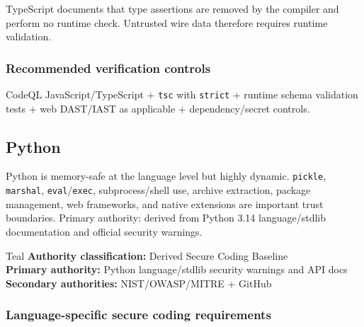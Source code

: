 \documentclass[10pt,letterpaper]{article}
\newcommand{\code}[1]{\texttt{\small #1}}
\begin{document}
TypeScript documents that type assertions are removed by the compiler and perform no runtime check. Untrusted wire data therefore requires runtime validation.\par
\subsubsection*{Recommended verification controls}
CodeQL JavaScript/TypeScript + \code{tsc} with \code{strict} + runtime schema validation tests + web DAST/IAST as applicable + dependency/secret controls.
\clearpage
\subsection{Python}
Python is memory-safe at the language level but highly dynamic. \code{pickle}, \code{marshal}, \code{eval}/\code{exec}, subprocess/shell use, archive extraction, package management, web frameworks, and native extensions are important trust boundaries. Primary authority: derived from Python 3.14 language/stdlib documentation and official security warnings.
\begin{callout}{Teal}
\textbf{Authority classification:} Derived Secure Coding Baseline\\
\textbf{Primary authority:} Python language/stdlib security warnings and API docs\\
\textbf{Secondary authorities:} NIST/OWASP/MITRE + GitHub
\end{callout}
\subsubsection*{Language-specific secure coding requirements}
\end{document}
